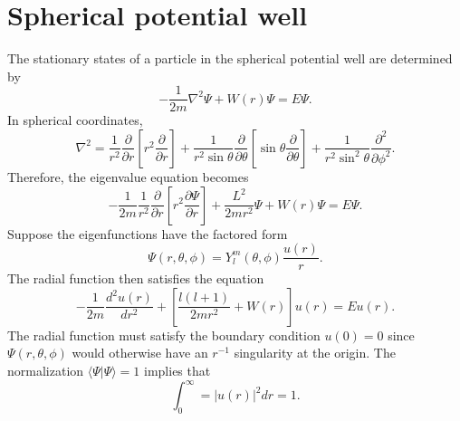 \section{Spherical potential well}
The stationary states of a particle in the spherical potential well are determined by
\[-\frac{1}{2m}\nabla^2 \Psi  + W(r) \Psi = E\Psi .\]
In spherical coordinates, 
\[\nabla^2 = \frac{1}{r^2} \frac{\partial}{\partial r} \left [ r^2\frac{\partial}{\partial r} \right ] + \frac{1}{r^2\sin\theta} \frac{\partial}{\partial \theta} \left [\sin\theta \frac{\partial}{\partial \theta} \right ] + \frac{1}{r^2\sin^2\theta} \frac{\partial^2}{\partial\phi^2}.\]
Therefore, the eigenvalue equation becomes
\[-\frac{1}{2m} \frac{1}{r^2} \frac{\partial}{\partial r} \left [ r^2\frac{\partial \Psi}{\partial r}\right ]  + \frac{L^2}{2mr^2} \Psi + W(r)\Psi = E\Psi.\]
Suppose the eigenfunctions have the factored form
\[\Psi(r,\theta,\phi) = Y_l^m(\theta,\phi) \frac{u(r)}{r}.\]
The radial function then satisfies the equation
\[-\frac{1}{2m} \frac{d^2 u(r)}{dr^2} + \left[ \frac{l(l+1)}{2mr^2} + W(r)\right]u(r) = Eu(r).\]
The radial function must satisfy the boundary condition $u(0) = 0$ since $\Psi(r,\theta,\phi)$ would otherwise have an $r^{-1}$ singularity at the origin. The normalization $\langle \Psi | \Psi \rangle = 1$ implies that
\[\int_0^{\infty} = |u(r)|^2 dr = 1.\]

